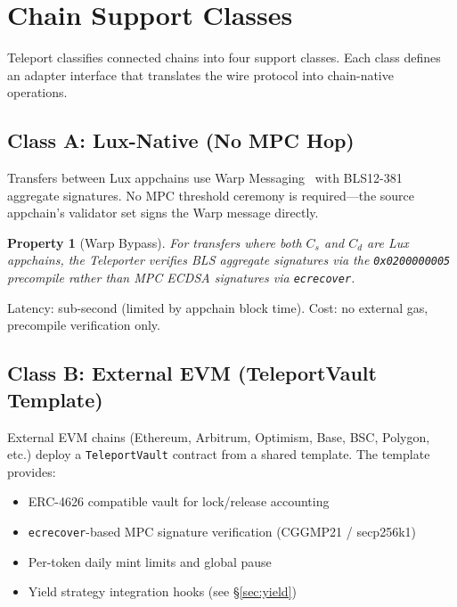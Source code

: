 \documentclass[11pt]{article}
\newtheorem{property}{Property}
\begin{document}
\section{Chain Support Classes}
\label{sec:adapters}

Teleport classifies connected chains into four support classes. Each class defines an adapter interface that translates the wire protocol into chain-native operations.

\subsection{Class A: Lux-Native (No MPC Hop)}
\label{sec:class-a}

Transfers between Lux appchains use Warp Messaging~\cite{luxwarp2023} with BLS12-381 aggregate signatures. No MPC threshold ceremony is required---the source appchain's validator set signs the Warp message directly.

\begin{property}[Warp Bypass]
For transfers where both $C_s$ and $C_d$ are Lux appchains, the Teleporter verifies BLS aggregate signatures via the \texttt{0x0200000005} precompile rather than MPC ECDSA signatures via \texttt{ecrecover}.
\end{property}

Latency: sub-second (limited by appchain block time). Cost: no external gas, precompile verification only.

\subsection{Class B: External EVM (TeleportVault Template)}
\label{sec:class-b}

External EVM chains (Ethereum, Arbitrum, Optimism, Base, BSC, Polygon, etc.) deploy a \texttt{TeleportVault} contract from a shared template. The template provides:

\begin{itemize}[nosep]
  \item ERC-4626 compatible vault for lock/release accounting
  \item \texttt{ecrecover}-based MPC signature verification (CGGMP21 / secp256k1)
  \item Per-token daily mint limits and global pause
  \item Yield strategy integration hooks (see \S\ref{sec:yield})
\end{itemize}
\end{document}
